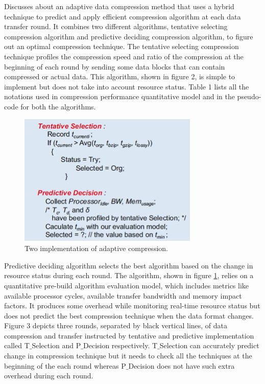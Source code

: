 \documentclass[runningheads,a4paper]{llncs}
\begin{document}
{Discusses about an adaptive data compression method that uses a hybrid technique to predict and apply efficient compression algorithm at each data transfer round. It combines two different algorithms, tentative selecting compression algorithm and predictive deciding compression algorithm, to figure out an optimal compression technique. The tentative selecting compression technique profiles the compression speed and ratio of the compression at the beginning of each round by sending some data blocks that can contain compressed or actual data. This algorithm, shown in figure 2, is simple to implement but does not take into account resource status. Table 1 lists all the notations used in compression performance quantitative model and in the pseudo-code for both the algorithms.
\begin{figure}[!htb]
	\includegraphics[scale=0.7]{./images/krunal8}
	\centering
	\caption{Two implementation of adaptive compression.}
	\label{fig:krunal8}
\end{figure}

Predictive deciding algorithm selects the best algorithm based on the change in resource status during each round. The algorithm, shown in figure \ref{fig:krunal8}, relies on a quantitative pre-build algorithm evaluation model, which includes metrics like available processor cycles, available transfer bandwidth and memory impact factors. It produces some overhead while monitoring real-time resource status but does not predict the best compression technique when the data format changes. Figure 3 depicts three rounds, separated by black vertical lines, of data compression and transfer instructed by tentative and predictive implementation called T$\_$Selection and P$\_$Decision respectively. T$\_$Selection can accurately predict change in compression technique but it needs to check all the techniques at the beginning of the each round whereas P$\_$Decision does not have such extra overhead during each round. 

}
\end{document}
